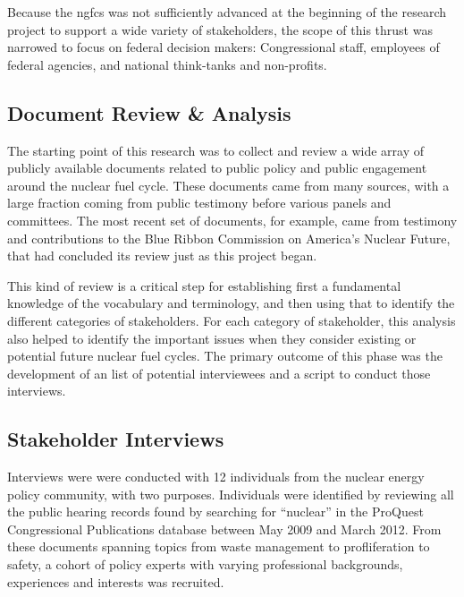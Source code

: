 Because the \gls{ngfcs} was not sufficiently advanced at the beginning of the
research project to support a wide variety of stakeholders, the scope of this
thrust was narrowed to focus on federal decision makers: Congressional staff,
employees of federal agencies, and national think-tanks and non-profits.

\subsection{Document Review \& Analysis}

The starting point of this research was to collect and review a wide array of
publicly available documents related to public policy and public engagement
around the nuclear fuel cycle.  These documents came from many sources, with a
large fraction coming from public testimony before various panels and
committees.  The most recent set of documents, for example, came from
testimony and contributions to the Blue Ribbon Commission on America's Nuclear
Future, that had concluded its review just as this project began.

This kind of review is a critical step for establishing first a fundamental
knowledge of the vocabulary and terminology, and then using that to identify
the different categories of stakeholders.  For each category of stakeholder,
this analysis also helped to identify the important issues when they consider
existing or potential future nuclear fuel cycles.  The primary outcome of
this phase was the development of an list of potential interviewees and a
script to conduct those interviews.

\subsection{Stakeholder Interviews}

Interviews were were conducted with 12 individuals from the nuclear energy
policy community, with two purposes.  Individuals were identified by reviewing
all the public hearing records found by searching for ``nuclear'' in the
ProQuest Congressional Publications database between May 2009 and March 2012.
From these documents spanning topics from waste management to profliferation
to safety, a cohort of policy experts with varying professional backgrounds,
experiences and interests was recruited.


